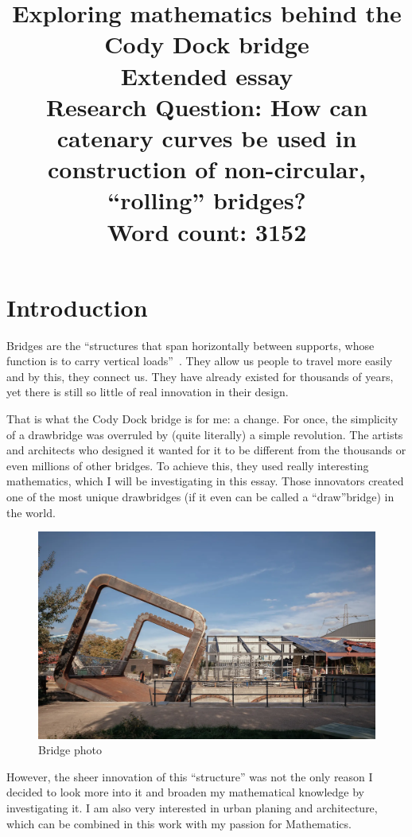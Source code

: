 \documentclass[12pt]{article}
\title{Exploring mathematics behind the Cody Dock bridge \\
    \large Extended essay \\
    \normalsize Research Question: How can catenary curves be used in construction of non-circular, ``rolling'' bridges? \\
    \vspace{12pt} Word count: 3152}
\date{}
\author{}
\begin{document}
    \maketitle
    \newpage
    \tableofcontents
    \newpage
    
    \section{Introduction}

        Bridges are the ``structures that span horizontally between supports, whose function is to carry vertical loads''~\cite{bridge_encyplopedia}. They allow us people to travel more easily and by this, they connect us. They have already existed for thousands of years, yet there is still so little of real innovation in their design.
    
        That is what the Cody Dock bridge is for me: a change. For once, the simplicity of a drawbridge was overruled by (quite literally) a simple revolution. The artists and architects who designed it wanted for it to be different from the thousands or even millions of other bridges. To achieve this, they used really interesting mathematics, which I will be investigating in this essay. Those innovators created one of the most unique drawbridges (if it even can be called a ``draw''bridge) in the world.

        \begin{figure}[H]
            \centering
            \includegraphics[width=0.75\linewidth]{images/bridge.png}
            \caption[Bridge photo]{Bridge photo\footnotemark}\label{fig:bridge_photo}
        \end{figure}

        However, the sheer innovation of this ``structure'' was not the only reason I decided to look more into it and broaden my mathematical knowledge by investigating it. I am also very interested in urban planing and architecture, which can be combined in this work with my passion for Mathematics.
\end{document}
